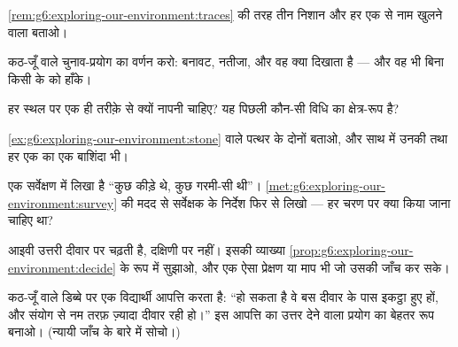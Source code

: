 \begin{exercise}[$\star$]\label{exo:g6:exploring-our-environment:6}
\cref{rem:g6:exploring-our-environment:traces} की तरह तीन निशान और हर
एक से नाम खुलने वाला  बताओ।
\end{exercise}

\begin{exercise}[$\star\star$]\label{exo:g6:exploring-our-environment:7}
कठ-जूँ वाले चुनाव-प्रयोग का वर्णन करो: बनावट, नतीजा, और वह क्या दिखाता
है --- और वह भी बिना किसी के  को हाँके।
\end{exercise}

\begin{exercise}[$\star\star$]\label{exo:g6:exploring-our-environment:8}
हर स्थल पर  एक ही तरीक़े से क्यों नापनी चाहिए? यह पिछली
कौन-सी विधि का क्षेत्र-रूप है?
\end{exercise}

\begin{exercise}[$\star\star$]\label{exo:g6:exploring-our-environment:9}
\cref{ex:g6:exploring-our-environment:stone} वाले पत्थर के दोनों  बताओ, और साथ में उनकी  तथा हर एक का एक बाशिंदा भी।
\end{exercise}

\begin{exercise}[$\star\star$]\label{exo:g6:exploring-our-environment:10}
एक सर्वेक्षण में लिखा है ``कुछ कीड़े थे, कुछ गरमी-सी थी''।
\cref{met:g6:exploring-our-environment:survey} की मदद से सर्वेक्षक के
निर्देश फिर से लिखो --- हर चरण पर क्या किया जाना चाहिए था?
\end{exercise}

\begin{exercise}[$\star\star$]\label{exo:g6:exploring-our-environment:11}
आइवी उत्तरी दीवार पर चढ़ती है, दक्षिणी पर नहीं। इसकी व्याख्या
\cref{prop:g6:exploring-our-environment:decide} के रूप में सुझाओ, और
एक ऐसा प्रेक्षण या माप भी जो उसकी जाँच कर सके।
\end{exercise}

\begin{exercise}[$\star\star\star$]\label{exo:g6:exploring-our-environment:12}
कठ-जूँ वाले डिब्बे पर एक विद्यार्थी आपत्ति करता है: ``हो सकता है वे बस
दीवार के पास इकट्ठा हुए हों, और संयोग से नम तरफ़ ज़्यादा दीवार रही
हो।'' इस आपत्ति का उत्तर देने वाला प्रयोग का बेहतर रूप बनाओ। (न्यायी
जाँच के बारे में सोचो।)
\end{exercise}

